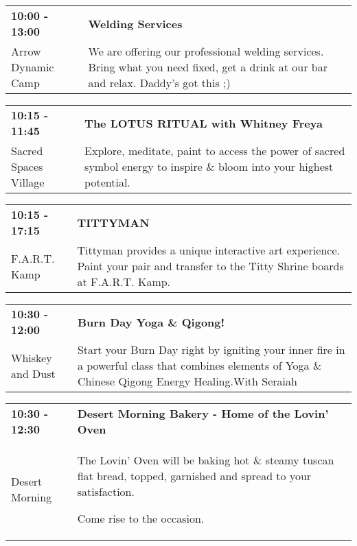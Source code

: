 \begin{tabular}{ p{1in} p{2.2in} }
    \textbf{10:00 - 13:00} & \textbf{Welding Services} \\
    Arrow Dynamic Camp \newline  & We are offering our professional welding services.  Bring what you need fixed, get a drink at our bar and relax. Daddy's got this ;) \\
    \hline 
\end{tabular}
    
\begin{tabular}{ p{1in} p{2.2in} }
    \textbf{10:15 - 11:45} & \textbf{The LOTUS RITUAL with Whitney Freya} \\
    Sacred Spaces Village \newline  & Explore, meditate, paint to access the power of sacred symbol energy to inspire \& bloom into your highest potential. \\
    \hline 
\end{tabular}
    
\begin{tabular}{ p{1in} p{2.2in} }
    \textbf{10:15 - 17:15} & \textbf{TITTYMAN} \\
    F.A.R.T. Kamp \newline  & Tittyman provides a unique interactive art experience. Paint your pair and transfer to the Titty Shrine boards at F.A.R.T. Kamp. \\
    \hline 
\end{tabular}
    
\begin{tabular}{ p{1in} p{2.2in} }
    \textbf{10:30 - 12:00} & \textbf{Burn Day Yoga \& Qigong!} \\
    Whiskey and Dust \newline  & Start your Burn Day right by igniting your inner fire in a powerful class that combines elements of Yoga \& Chinese Qigong Energy Healing.With Seraiah \\
    \hline 
\end{tabular}
    
\begin{tabular}{ p{1in} p{2.2in} }
    \textbf{10:30 - 12:30} & \textbf{Desert Morning Bakery - Home of the Lovin' Oven} \\
    Desert Morning \newline  & The Lovin' Oven will be baking hot \& steamy tuscan flat bread, topped, garnished and spread to your satisfaction.

Come rise to the occasion. \\
    \hline 
\end{tabular}
    
